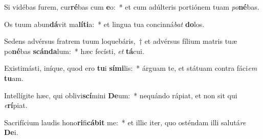 \item Si vidébas furem, cur\textbf{ré}bas cum \textbf{e}o:~* et cum adúlteris portiónem tuam \textit{po}\textbf{né}bas.
\item Os tuum abun\textbf{dá}vit ma\textbf{lí}\textbf{ti}a:~* et lingua tua concinná\textit{bat} \textbf{do}los.
\item Sedens advérsus fratrem tuum loquebáris,~† et advérsus fílium matris tuæ po\textbf{né}bas \textbf{scán}\textbf{da}lum:~* hæc fecísti, \textit{et} \textbf{tá}cui.
\item Existimásti, iníque, quod ero \textbf{tu}i \textbf{sí}\textbf{mi}lis:~* árguam te, et státuam contra fáci\textit{em} \textbf{tu}am.
\item Intellígite hæc, qui oblivi\textbf{scí}mini \textbf{De}um:~* nequándo rápiat, et non sit qui \textit{e}\textbf{rí}piat.
\item Sacrifícium laudis hono\textbf{ri}fi\textbf{cá}\textbf{bit} me:~* et illic iter, quo osténdam illi salutá\textit{re} \textbf{De}i.
